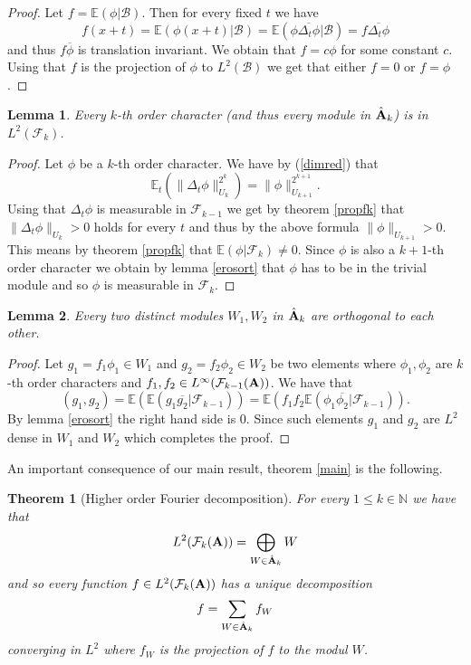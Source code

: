 \documentclass [11pt] {article}
\newtheorem{lemma}{Lemma}[section]
\newtheorem{theorem}{Theorem}
\def\bA{{\bf A}}
\begin{document}
\begin{proof} 
Let $f=\mathbb{E}(\phi|\mathcal{B})$. Then for every fixed $t$ we have $$f(x+t)=\mathbb{E}(\phi(x+t)|\mathcal{B})=\mathbb{E}(\phi\overline{\Delta_t\phi}|\mathcal{B})=f\overline{\Delta_t\phi}$$
and thus $f\overline\phi$ is translation invariant. We obtain that $f=c\phi$ for some constant $c$. Using that $f$ is the projection of $\phi$ to $L^2(\mathcal{B})$ we get that either $f=0$ or $f=\phi$. 
\end{proof}


\begin{lemma}\label{kisk} Every $k$-th order character (and thus every module in $\hat{\bA}_k$) is in $L^2(\mathcal{F}_k)$.
\end{lemma}

\begin{proof} Let $\phi$ be a $k$-th order character. We have by (\ref{dimred}) that $$\mathbb{E}_t(\|\Delta_t\phi\|_{U_k}^{2^k})=\|\phi\|_{U_{k+1}}^{2^{k+1}}.$$
Using that $\Delta_t\phi$ is measurable in $\mathcal{F}_{k-1}$ we get by theorem \ref{propfk} that $\|\Delta_t\phi\|_{U_k}>0$ holds for every $t$ and thus by the above formula $\|\phi\|_{U_{k+1}}>0$. This means by theorem \ref{propfk} that $\mathbb{E}(\phi|\mathcal{F}_k)\neq 0$. Since $\phi$ is also a $k+1$-th order character we obtain by lemma \ref{erosort} that $\phi$ has to be in the trivial module and so $\phi$ is measurable in $\mathcal{F}_k$. 
\end{proof}

\begin{lemma}\label{charort} Every two distinct modules $W_1,W_2$ in $\hat{\bA}_k$ are orthogonal to each other.
\end{lemma}

\begin{proof} Let $g_1=f_1\phi_1\in W_1$ and $g_2=f_2\phi_2\in W_2$ be two elements where $\phi_1,\phi_2$ are $k$-th order characters and $f_1,f_2\in L^\infty(\mathcal{F}_{k-1}(\bA))$. We have that $$(g_1,g_2)=\mathbb{E}(\mathbb{E}(g_1\overline{g_2}|\mathcal{F}_{k-1}))=\mathbb{E}(f_1f_2\mathbb{E}(\phi_1\overline{\phi_2}|\mathcal{F}_{k-1})).$$
By lemma \ref{erosort} the right hand side is $0$. Since such elements $g_1$ and $g_2$ are $L^2$ dense in $W_1$ and $W_2$ which completes the proof.
\end{proof}

An important consequence of our main result, theorem \ref{main} is the following.

\begin{theorem}[Higher order Fourier decomposition]\label{hofdecomp} For every $1\leq k\in\mathbb{N}$ we have that
$$L^2(\mathcal{F}_k(\bA))=\bigoplus_{W\in\hat{\bA}_k}W$$
and so every function $f\in L^2(\mathcal{F}_k(\bA))$ has a unique decomposition
$$f=\sum_{W\in\hat{\bA}_k}f_W$$ converging in $L^2$ where $f_W$ is the projection of $f$ to the modul $W$.
\end{theorem}
\end{document}
